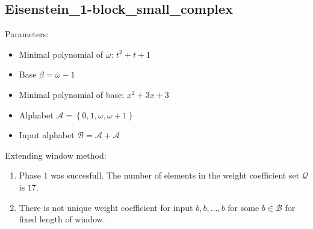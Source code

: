 \subsection{ Eisenstein\_1-block\_small\_complex }

\label{subsec:Eisenstein1-blocksmallcomplex}

Parameters:
\begin{itemize}
    \item Minimal polynomial of $\omega$: $ t^{2} + t + 1 $
    \item Base $\beta= \omega - 1 $
    \item Minimal polynomial of base: $ x^{2} + 3x + 3 $
    \item Alphabet $\mathcal{A} =\left\{0, 1, \omega, \omega + 1\right\}$
    \item Input alphabet $\mathcal{B} =\mathcal{A}+ \mathcal{A}$
\end{itemize}

\noindent Extending window method:
\begin{enumerate}
    \item Phase 1 was succesfull.
The number of elements in the weight coefficient set $\mathcal{Q}$ is $17$.

    \item There is not unique weight coefficient for input $b,b,\dots,b$ for some $b\in\mathcal{B}$ for fixed length of window.

\end{enumerate}
